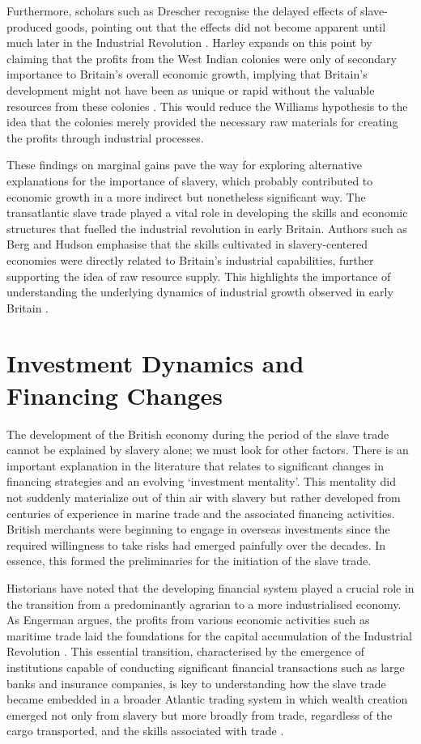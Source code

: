 \documentclass[a4paper,11pt]{article}
\begin{document}
Furthermore, scholars such as Drescher recognise the delayed effects of slave-produced goods, pointing out that the effects did not become apparent until much later in the Industrial Revolution \citep{drescher1997}. Harley expands on this point by claiming that the profits from the West Indian colonies were only of secondary importance to Britain's overall economic growth, implying that Britain's development might not have been as unique or rapid without the valuable resources from these colonies \citep{harley2015}. This would reduce the Williams hypothesis to the idea that the colonies merely provided the necessary raw materials for creating the profits through industrial processes.

These findings on marginal gains pave the way for exploring alternative explanations for the importance of slavery, which probably contributed to economic growth in a more indirect but nonetheless significant way. The transatlantic slave trade played a vital role in developing the skills and economic structures that fuelled the industrial revolution in early Britain. Authors such as Berg and Hudson emphasise that the skills cultivated in slavery-centered economies were directly related to Britain's industrial capabilities, further supporting the idea of raw resource supply. This highlights the importance of understanding the underlying dynamics of industrial growth observed in early Britain \citep{berghudson2021}.

\section{Investment Dynamics and Financing Changes}

The development of the British economy during the period of the slave trade cannot be explained by slavery alone; we must look for other factors. There is an important explanation in the literature that relates to significant changes in financing strategies and an evolving ‘investment mentality’. This mentality did not suddenly materialize out of thin air with slavery but rather developed from centuries of experience in marine trade and the associated financing activities. British merchants were beginning to engage in overseas investments since the required willingness to take risks had emerged painfully over the decades. In essence, this formed the preliminaries for the initiation of the slave trade.

Historians have noted that the developing financial system played a crucial role in the transition from a predominantly agrarian to a more industrialised economy. As Engerman argues, the profits from various economic activities such as maritime trade laid the foundations for the capital accumulation of the Industrial Revolution \citep{eltisengerman2000}. This essential transition, characterised by the emergence of institutions capable of conducting significant financial transactions such as large banks and insurance companies, is key to understanding how the slave trade became embedded in a broader Atlantic trading system in which wealth creation emerged not only from slavery but more broadly from trade, regardless of the cargo transported, and the skills associated with trade \citep{solow1985}.
\end{document}
